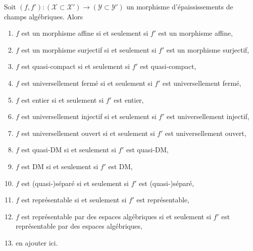 \begin{lemma}
\label{lemma-thicken-property-morphisms}
Soit $(f, f') : (\mathcal{X} \subset \mathcal{X}') \to
(\mathcal{Y} \subset \mathcal{Y}')$
un morphisme d'épaississements de champs algébriques. Alors
\begin{enumerate}
\item $f$ est un morphisme affine si et seulement si $f'$ est un morphisme affine,
\item $f$ est un morphisme surjectif si et seulement si $f'$ est un morphisme surjectif,
\item $f$ est quasi-compact si et seulement si $f'$ est quasi-compact,
\item $f$ est universellement fermé si et seulement si $f'$ est universellement fermé,
\item $f$ est entier si et seulement si $f'$ est entier,
\item $f$ est universellement injectif si et seulement si $f'$ est universellement injectif,
\item $f$ est universellement ouvert si et seulement si $f'$ est universellement ouvert,
\item $f$ est quasi-DM si et seulement si $f'$ est quasi-DM,
\item $f$ est DM si et seulement si $f'$ est DM,
\item $f$ est (quasi-)séparé si et seulement si $f'$ est (quasi-)séparé,
\item $f$ est représentable si et seulement si $f'$ est représentable,
\item $f$ est représentable par des espaces algébriques si et seulement si $f'$ est
représentable par des espaces algébriques,
\item en ajouter ici.
\end{enumerate}
\end{lemma}

